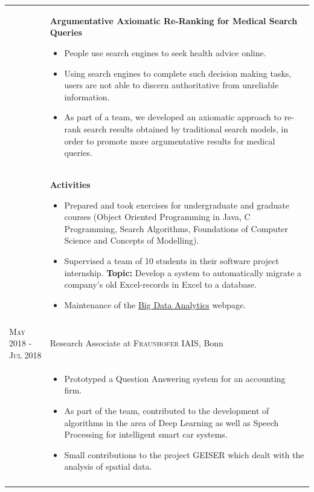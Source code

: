 \documentclass[a4paper,10pt]{article} %
\begin{document}
\begin{longtable}{l p{11cm}}
& \textbf{\footnotesize{Argumentative Axiomatic Re-Ranking for Medical Search Queries}}\vspace{0.2em}
  {\footnotesize
  	\begin{itemize}
  		\setlength\itemsep{0.2em}
 		\item People use search engines to seek health advice online. 
		\item Using search engines to complete such decision making tasks, users are not able to discern authoritative from unreliable information.
		\item As part of a team, we developed an axiomatic approach to re-rank search results obtained by traditional search models, in order to promote more argumentative results for medical queries.   
  \end{itemize}
  }
\\[-2mm]
& \textbf{\footnotesize{Activities}}\vspace{0.2em}
  {\footnotesize
  	\begin{itemize}
  		\setlength\itemsep{0.2em}
 		\item Prepared and took exercises for undergraduate and graduate courses (Object Oriented Programming in Java, C Programming, Search Algorithms, Foundations of Computer Science and Concepts of Modelling).
 		\item Supervised a team of 10 students in their software project internship. \newline \textbf{Topic:} Develop a system to automatically migrate a company's old Excel-records in Excel to a database.
 		\item Maintenance of the \href{https://www.informatik.uni-halle.de/arbeitsgruppen/big_data_analytics/}{Big Data Analytics} webpage.    
  \end{itemize}
  }
\\
\multicolumn{2}{c}{} \\[-1.5em]

\textsc{May 2018 - Jul 2018} & Research Associate at \textsc{Fraunhofer IAIS}, Bonn\\[-1em]
& {\footnotesize
  	\begin{itemize}
  		\setlength\itemsep{0.2em}
 		\item Prototyped a Question Answering system for an accounting firm.
		\item As part of the team, contributed to the development of algorithms in the area of Deep Learning as well as Speech Processing for intelligent smart car systems.
		\item Small contributions to the project GEISER which dealt with the analysis of spatial data. 
  \end{itemize}
  }\\
\multicolumn{2}{c}{} \\[-1.5em]


\end{longtable}
\end{document}
